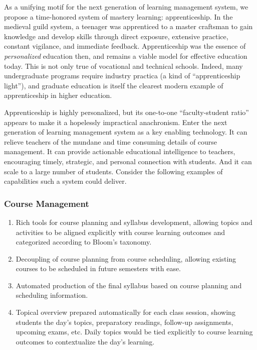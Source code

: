 \documentclass{article}
\begin{document}
As a unifying motif for the next generation of learning management system,
we propose a time-honored system of mastery learning: apprenticeship.
In the medieval guild system,
a teenager was apprenticed to a master craftsman
to gain knowledge and develop skills through
direct exposure,
extensive practice,
constant vigilance,
and immediate feedback.
Apprenticeship was the essence of \emph{personalized} education then,
and remains a viable model for effective education today.
This is not only true of vocational and technical schools.
Indeed, many undergraduate programs require
industry practica (a kind of ``apprenticeship light''),
and graduate education is itself the clearest modern example of apprenticeship
in higher education.

Apprenticeship is highly personalized,
but its one-to-one ``faculty-student ratio''
appears to make it a hopelessly impractical anachronism.
Enter the next generation of learning management system
as a key enabling technology.
It can relieve teachers
of the mundane and time consuming details
of course management.
It can provide actionable educational intelligence to teachers,
encouraging timely, strategic, and personal connection with students.
And it can scale to a large number of students.
Consider the following examples of capabilities such a system could deliver.

\subsubsection{Course Management}
\begin{enumerate}
\item Rich tools for course planning and syllabus development, allowing topics and
  activities to be aligned explicitly with course learning outcomes and categorized
  according to Bloom's taxonomy.
\item Decoupling of course planning from course scheduling, allowing existing courses to
  be scheduled in future semesters with ease.
\item Automated production of the final syllabus based on course planning and scheduling
  information.
\item Topical overview prepared automatically for each class session, showing students the
  day's topics, preparatory readings, follow-up assignments, upcoming exams, etc.
  Daily topics would be tied explicitly to course learning outcomes
  to contextualize the day's learning.
\end{enumerate}
\end{document}
